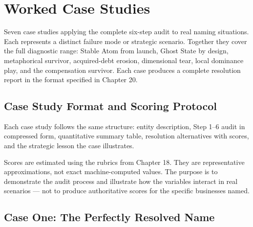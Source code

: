 \documentclass[12pt, openany]{book}
\theoremstyle{thmstyle}
\theoremstyle{defstyle}
\begin{document}
\chapter{Worked Case Studies}

\begin{keybox}
Seven case studies applying the complete six-step audit to real naming situations. Each represents a distinct failure mode or strategic scenario. Together they cover the full diagnostic range: Stable Atom from launch, Ghost State by design, metaphorical survivor, acquired-debt erosion, dimensional tear, local dominance play, and the compensation survivor. Each case produces a complete resolution report in the format specified in Chapter 20.
\end{keybox}

\section{Case Study Format and Scoring Protocol}

Each case study follows the same structure: entity description, Step 1--6 audit in compressed form, quantitative summary table, resolution alternatives with scores, and the strategic lesson the case illustrates.

Scores are estimated using the rubrics from Chapter 18. They are representative approximations, not exact machine-computed values. The purpose is to demonstrate the audit process and illustrate how the variables interact in real scenarios --- not to produce authoritative scores for the specific businesses named.

\section{Case One: The Perfectly Resolved Name}
\end{document}
